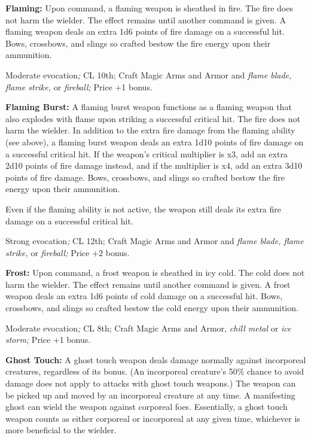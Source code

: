 \documentclass{article}
\begin{document}
\textbf{Flaming: }Upon command, a flaming weapon is sheathed in fire. The fire 
does not harm the wielder. The effect remains until another command is given. A 
flaming weapon deals an extra 1d6 points of fire damage on a successful hit. Bows, 
crossbows, and slings so crafted bestow the fire energy upon their ammunition.

Moderate evocation\textit{; }CL 10th; Craft Magic Arms and Armor and \textit{flame 
blade, flame strike, }or \textit{fireball; }Price +1 bonus.

\textbf{Flaming Burst: }A flaming burst weapon functions as a flaming weapon that 
also explodes with flame upon striking a successful critical hit. The fire does 
not harm the wielder. In addition to the extra fire damage from the flaming ability 
(see above), a flaming burst weapon deals an extra 1d10 points of fire damage on 
a successful critical hit. If the weapon's critical multiplier is x3, add an extra 
2d10 points of fire damage instead, and if the multiplier is x4, add an extra 3d10 
points of fire damage. Bows, crossbows, and slings so crafted bestow the fire energy 
upon their ammunition.

Even if the flaming ability is not active, the weapon still deals its extra fire 
damage on a successful critical hit.

Strong evocation\textit{; }CL 12th; Craft Magic Arms and Armor and \textit{flame 
blade, flame strike, }or \textit{fireball; }Price +2 bonus.

\textbf{Frost:} Upon command, a frost weapon is sheathed in icy cold. The cold 
does not harm the wielder. The effect remains until another command is given. A 
frost weapon deals an extra 1d6 points of cold damage on a successful hit. Bows, 
crossbows, and slings so crafted bestow the cold energy upon their ammunition.

Moderate evocation\textit{; }CL 8th; Craft Magic Arms and Armor, \textit{chill 
metal }or \textit{ice storm; }Price +1 bonus.

\textbf{Ghost Touch:} A ghost touch weapon deals damage normally against incorporeal 
creatures, regardless of its bonus. (An incorporeal creature's 50\% chance to avoid 
damage does not apply to attacks with ghost touch weapons.) The weapon can be picked 
up and moved by an incorporeal creature at any time. A manifesting ghost can wield 
the weapon against corporeal foes. Essentially, a ghost touch weapon counts as 
either corporeal or incorporeal at any given time, whichever is more beneficial 
to the wielder.
\end{document}
